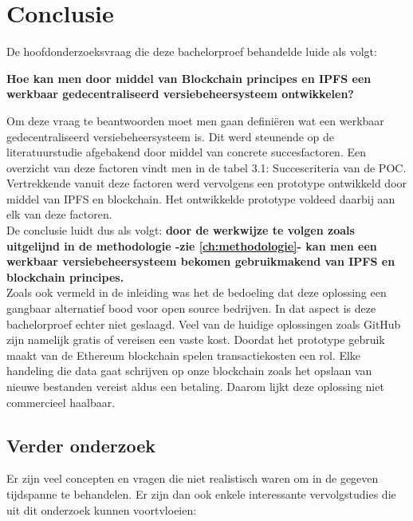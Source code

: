 
\chapter{Conclusie}
\label{ch:conclusie}
De hoofdonderzoeksvraag die deze bachelorproef behandelde luide als volgt: 

\textbf{Hoe kan men door middel van Blockchain principes en IPFS een werkbaar gedecentraliseerd versiebeheersysteem ontwikkelen?}

Om deze vraag te beantwoorden moet men gaan definiëren wat een werkbaar gedecentraliseerd versiebeheersysteem is. Dit werd steunende op de literatuurstudie afgebakend door middel van concrete succesfactoren. Een overzicht van deze factoren vindt men in de tabel 3.1: Succescriteria van de POC. Vertrekkende vanuit deze factoren werd vervolgens een prototype ontwikkeld door middel van IPFS en blockchain. Het ontwikkelde prototype voldeed daarbij aan elk van deze factoren.\\ 

De conclusie luidt dus als volgt: \textbf{door de werkwijze te volgen zoals uitgelijnd in de methodologie -zie \ref{ch:methodologie}- kan men een werkbaar versiebeheersysteem bekomen gebruikmakend van IPFS en blockchain principes.}\\

Zoals ook vermeld in de inleiding was het de bedoeling dat deze oplossing een gangbaar alternatief bood voor open source bedrijven. In dat aspect is deze bachelorproef echter niet geslaagd. Veel van de huidige oplossingen zoals GitHub zijn namelijk gratis of vereisen een vaste kost. Doordat het prototype gebruik maakt van de Ethereum blockchain spelen transactiekosten een rol. Elke handeling die data gaat schrijven op onze blockchain zoals het opslaan van nieuwe bestanden vereist aldus een betaling. Daarom lijkt deze oplossing niet commercieel haalbaar.\\

\section{Verder onderzoek}
Er zijn veel concepten en vragen die niet realistisch waren om in de gegeven tijdspanne te behandelen. Er zijn dan ook enkele interessante vervolgstudies die uit dit onderzoek kunnen voortvloeien:

